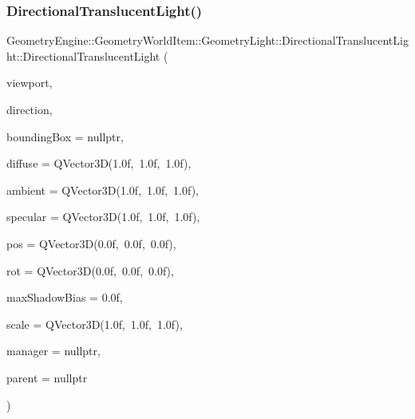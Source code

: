 \subsubsection{\texorpdfstring{DirectionalTranslucentLight()}{DirectionalTranslucentLight()}\hspace{0.1cm}{\footnotesize\ttfamily [1/2]}}
{\footnotesize\ttfamily Geometry\+Engine\+::\+Geometry\+World\+Item\+::\+Geometry\+Light\+::\+Directional\+Translucent\+Light\+::\+Directional\+Translucent\+Light (\begin{DoxyParamCaption}\item[{const \mbox{\hyperlink{class_geometry_engine_1_1_geometry_item_utils_1_1_viewport}{Geometry\+Item\+Utils\+::\+Viewport}} \&}]{viewport,  }\item[{const Q\+Vector3D \&}]{direction,  }\item[{\mbox{\hyperlink{class_geometry_engine_1_1_geometry_world_item_1_1_geometry_item_1_1_geometry_item}{Geometry\+Item\+::\+Geometry\+Item}} $\ast$}]{bounding\+Box = {\ttfamily nullptr},  }\item[{const Q\+Vector3D \&}]{diffuse = {\ttfamily QVector3D(1.0f,~1.0f,~1.0f)},  }\item[{const Q\+Vector3D \&}]{ambient = {\ttfamily QVector3D(1.0f,~1.0f,~1.0f)},  }\item[{const Q\+Vector3D \&}]{specular = {\ttfamily QVector3D(1.0f,~1.0f,~1.0f)},  }\item[{const Q\+Vector3D \&}]{pos = {\ttfamily QVector3D(0.0f,~0.0f,~0.0f)},  }\item[{const Q\+Vector3D \&}]{rot = {\ttfamily QVector3D(0.0f,~0.0f,~0.0f)},  }\item[{float}]{max\+Shadow\+Bias = {\ttfamily 0.0f},  }\item[{const Q\+Vector3D \&}]{scale = {\ttfamily QVector3D(1.0f,~1.0f,~1.0f)},  }\item[{const \mbox{\hyperlink{class_geometry_engine_1_1_light_utils_1_1_light_component_manager}{Light\+Utils\+::\+Light\+Component\+Manager}} $\ast$const}]{manager = {\ttfamily nullptr},  }\item[{\mbox{\hyperlink{class_geometry_engine_1_1_geometry_world_item_1_1_world_item}{World\+Item}} $\ast$}]{parent = {\ttfamily nullptr} }\end{DoxyParamCaption})}

